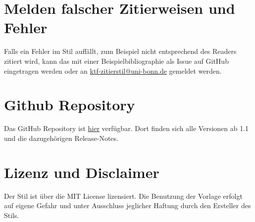 \documentclass[12pt]{article}
\begin{document}
\section{Melden falscher Zitierweisen und Fehler}
Falls ein Fehler im Stil auffällt, zum Beispiel nicht entsprechend des Readers zitiert wird, kann das mit einer Beispielbibliographie als Issue auf GitHub eingetragen werden oder an \href{mailto:ktf-zitierstil@uni-bonn.de}{ktf-zitierstil@uni-bonn.de} gemeldet werden.

\section{Github Repository}
Das GitHub Repository ist \href{https://github.com/luisluet/ktf_cite/}{hier} verfügbar. Dort finden sich alle Versionen ab 1.1 und die dazugehörigen Release-Notes.

\section{Lizenz und Disclaimer}
Der Stil ist über die MIT License lizensiert. Die Benutzung der Vorlage erfolgt auf eigene Gefahr und unter Ausschluss jeglicher Haftung durch den Ersteller des Stils.
\end{document}
